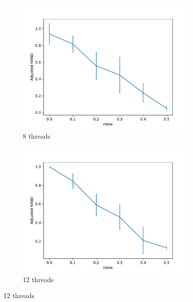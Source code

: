 \begin{figure}
	\begin{center}
		\begin{subfigure}[b]{0.3\textwidth}
			\centering
			\includegraphics[width=\textwidth]{tex/out/synthetic_8t/model2_noise_adj_rand.pdf}
			\caption{8 threads}
			\label{fig:tex/out/synthetic_8t/model2_noise_adj_rand.pdf}
		\end{subfigure}
		\begin{subfigure}[b]{0.3\textwidth}
			\centering
			\includegraphics[width=\textwidth]{tex/out/synthetic_12t/model2_noise_adj_rand.pdf}
			\caption{12 threads}
			\label{fig:tex/out/synthetic_8t/model2_noise_adj_rand.pdf}
		\end{subfigure}

\end{center}
\end{figure}
